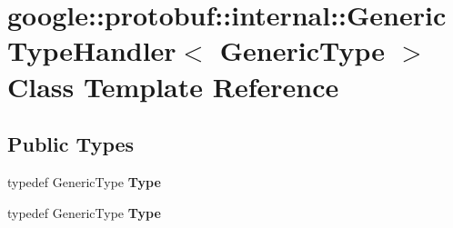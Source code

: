 \hypertarget{classgoogle_1_1protobuf_1_1internal_1_1GenericTypeHandler}{}\section{google\+:\+:protobuf\+:\+:internal\+:\+:Generic\+Type\+Handler$<$ Generic\+Type $>$ Class Template Reference}
\label{classgoogle_1_1protobuf_1_1internal_1_1GenericTypeHandler}
\subsection*{Public Types}
\begin{DoxyCompactItemize}
\item 
\mbox{\label{classgoogle_1_1protobuf_1_1internal_1_1GenericTypeHandler_ab26e2ee4c28c906b302b4eabf60db035}} 
typedef Generic\+Type {\bfseries Type}
\item 
\mbox{\label{classgoogle_1_1protobuf_1_1internal_1_1GenericTypeHandler_ab26e2ee4c28c906b302b4eabf60db035}} 
typedef Generic\+Type {\bfseries Type}
\end{DoxyCompactItemize}
